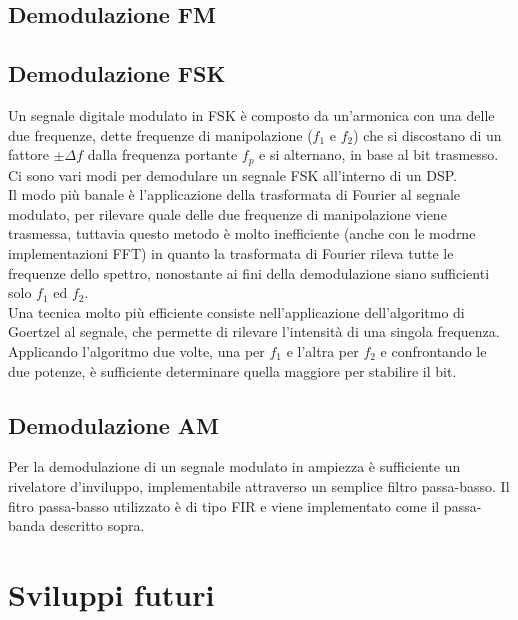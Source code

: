 \documentclass{article}
\begin{document}
\subsection{Demodulazione FM}
\subsection{Demodulazione FSK}
Un segnale digitale modulato in FSK è composto da un'armonica con una delle due frequenze, dette frequenze di manipolazione
($f_1$ e $f_2$) che si discostano di un fattore $\pm \Delta f$ dalla frequenza portante $f_p$ e si alternano, in base al bit
trasmesso. Ci sono vari modi per demodulare un segnale FSK all'interno di un DSP.\\
Il modo più banale è l'applicazione della trasformata di Fourier al segnale modulato, per rilevare quale delle due frequenze
di manipolazione viene trasmessa, tuttavia questo metodo è molto inefficiente (anche con le modrne implementazioni FFT) in quanto
la trasformata di Fourier rileva tutte le frequenze dello spettro, nonostante ai fini della demodulazione siano sufficienti
solo $f_1$ ed $f_2$.\\
Una tecnica molto più efficiente consiste nell'applicazione dell'algoritmo di Goertzel al segnale, che permette di rilevare
l'intensità di una singola frequenza. Applicando l'algoritmo due volte, una per $f_1$ e l'altra per $f_2$ e confrontando le due
potenze, è sufficiente determinare quella maggiore per stabilire il bit.

\subsection{Demodulazione AM}
Per la demodulazione di un segnale modulato in ampiezza è sufficiente un rivelatore d'inviluppo, implementabile attraverso un semplice
filtro passa-basso. Il fitro passa-basso utilizzato è di tipo FIR e viene implementato come il passa-banda descritto sopra.

\section{Sviluppi futuri}
\end{document}

